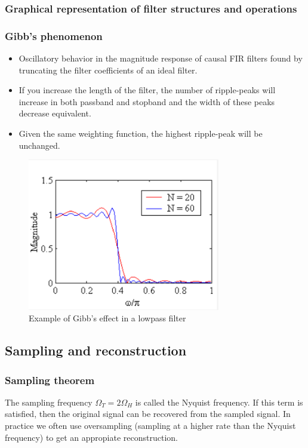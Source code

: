 \documentclass{article}
\begin{document}
\clearpage

\subsubsection{Graphical representation of filter structures and operations}

\subsubsection{Gibb's phenomenon}

\begin{itemize}
    \item Oscillatory behavior in the magnitude response of causal FIR filters found by truncating the filter coefficients of an ideal filter.
    \item If you increase the length of the filter, the number of ripple-peaks will increase in both passband and stopband and the width of these peaks decrease equivalent.
    \item Given the same weighting function, the highest ripple-peak will be unchanged. 
\end{itemize}
\begin{figure}[h!]
    \centering
    \includegraphics[width=0.75\textwidth]{figures/Filter design/gibbs_effekt.png}
    \caption{Example of Gibb's effect in a lowpass filter}
    \label{fig:gibbs_effect}
\end{figure}

\clearpage

\subsection{Sampling and reconstruction}
\subsubsection{Sampling theorem}
The sampling frequency $\Omega_T = 2\Omega_H$ is called the Nyquist frequency. If this term is satisfied, then the original signal can be recovered from the sampled signal. In practice we often use oversampling (sampling at a higher rate than the Nyquist frequency) to get an appropiate reconstruction.
\end{document}
